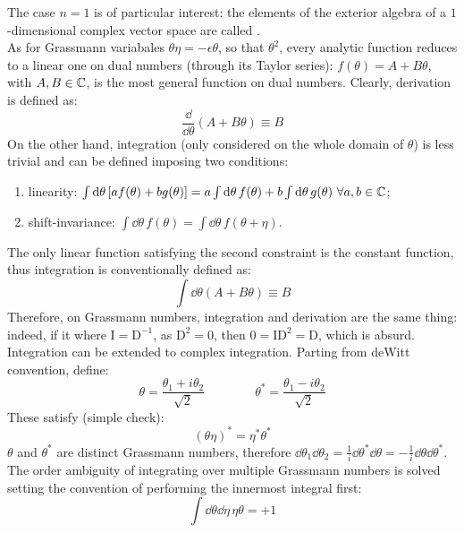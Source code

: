The case $ n = 1 $ is of particular interest: the elements of the exterior algebra of a $ 1 $-dimensional complex vector space are called . \\
As for Grassmann variabales $ \theta \eta = - \epsilon \theta $, so that $ \theta^2 $, every analytic function reduces to a linear one on dual numbers (through its Taylor series): $ f(\theta) = A + B \theta $, with $ A,B \in \mathbb{C} $, is the most general function on dual numbers. Clearly, derivation is defined as:
\begin{equation}
  \frac{\dd}{\dd \theta} \left( A + B \theta \right) \equiv B
\end{equation}
On the other hand, integration (only considered on the whole domain of $ \theta $) is less trivial and can be defined imposing two conditions:
\begin{enumerate}
  \item linearity: $ \int \mathrm{d}\theta \left[ a f(\theta) + b g(\theta) \right] = a \int \mathrm{d}\theta\, f(\theta) + b \int \mathrm{d}\theta\, g(\theta) \,\,\forall a,b \in \mathbb{C} $;
  \item shift-invariance: $ \int \dd\theta\, f(\theta) = \int \dd\theta\, f(\theta + \eta) $.
\end{enumerate}
The only linear function satisfying the second constraint is the constant function, thus integration is conventionally defined as:
\begin{equation}
  \int \dd\theta \left( A + B \theta \right) \equiv B
\end{equation}
Therefore, on Grassmann numbers, integration and derivation are the same thing: indeed, if it where $ \text{I} = \text{D}^{-1} $, as $ \text{D}^2 = 0 $, then $ 0 = \text{I} \text{D}^2 = \text{D} $, which is absurd. \\
Integration can be extended to complex integration. Parting from deWitt convention, define:
\begin{equation}
  \theta = \frac{\theta_1 + i \theta_2}{\sqrt{2}}
  \qquad \qquad
  \theta^* = \frac{\theta_1 - i \theta_2}{\sqrt{2}}
\end{equation}
These satisfy (simple check):
\begin{equation}
  (\theta \eta)^* = \eta^* \theta^*
\end{equation}
$ \theta $ and $ \theta^* $ are distinct Grassmann numbers, therefore $ \dd \theta_1 \dd \theta_2 = \frac{1}{i} \dd \theta 
^* \dd \theta = - \frac{1}{i} \dd \theta \dd \theta^* $. The order ambiguity of integrating over multiple Grassmann numbers is solved setting the convention of performing the innermost integral first:
\begin{equation}
  \int \dd \theta \dd \eta\, \eta \theta = +1
\end{equation}

